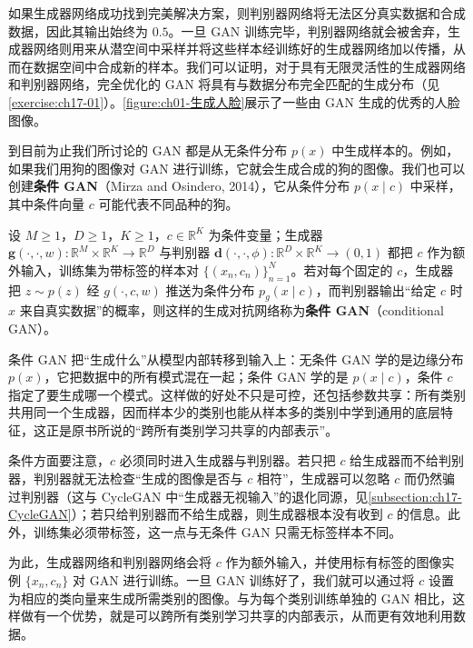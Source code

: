 \documentclass[../../main.tex]{subfiles}
\begin{document}
如果生成器网络成功找到完美解决方案，则判别器网络将无法区分真实数据和合成数据，因此其输出始终为 $0.5$。一旦 GAN 训练完毕，判别器网络就会被舍弃，生成器网络则用来从潜空间中采样并将这些样本经训练好的生成器网络加以传播，从而在数据空间中合成新的样本。我们可以证明，对于具有无限灵活性的生成器网络和判别器网络，完全优化的 GAN 将具有与数据分布完全匹配的生成分布（见\cref{exercise:ch17-01}）。\cref{figure:ch01-生成人脸}展示了一些由 GAN 生成的优秀的人脸图像。

到目前为止我们所讨论的 GAN 都是从无条件分布 $p(x)$ 中生成样本的。例如，如果我们用狗的图像对 GAN 进行训练，它就会生成合成的狗的图像。我们也可以创建\textbf{条件 GAN}（Mirza and Osindero, 2014），它从条件分布 $p(x\mid c)$ 中采样，其中条件向量 $c$ 可能代表不同品种的狗。

\begin{definition}[条件 GAN]\label{definition:ch17-条件GAN}
设 $M\geqslant1$，$D\geqslant1$，$K\geqslant1$，$c\in\mathbb{R}^{K}$ 为条件变量；生成器 $\bm{g}(\cdot,\cdot,w):\mathbb{R}^{M}\times\mathbb{R}^{K}\to\mathbb{R}^{D}$ 与判别器 $\bm{d}(\cdot,\cdot,\phi):\mathbb{R}^{D}\times\mathbb{R}^{K}\to(0,1)$ 都把 $c$ 作为额外输入，训练集为带标签的样本对 $\{(x_n,c_n)\}_{n=1}^{N}$。若对每个固定的 $c$，生成器把 $z\sim p(z)$ 经 $g(\cdot,c,w)$ 推送为条件分布 $p_g(x\mid c)$，而判别器输出“给定 $c$ 时 $x$ 来自真实数据”的概率，则这样的生成对抗网络称为\textbf{条件 GAN}（conditional GAN）。
\end{definition}

\begin{remark}
条件 GAN 把“生成什么”从模型内部转移到输入上：无条件 GAN 学的是边缘分布 $p(x)$，它把数据中的所有模式混在一起；条件 GAN 学的是 $p(x\mid c)$，条件 $c$ 指定了要生成哪一个模式。这样做的好处不只是可控，还包括参数共享：所有类别共用同一个生成器，因而样本少的类别也能从样本多的类别中学到通用的底层特征，这正是原书所说的“跨所有类别学习共享的内部表示”。

条件方面要注意，$c$ 必须同时进入生成器与判别器。若只把 $c$ 给生成器而不给判别器，判别器就无法检查“生成的图像是否与 $c$ 相符”，生成器可以忽略 $c$ 而仍然骗过判别器（这与 CycleGAN 中“生成器无视输入”的退化同源，见\cref{subsection:ch17-CycleGAN}）；若只给判别器而不给生成器，则生成器根本没有收到 $c$ 的信息。此外，训练集必须带标签，这一点与无条件 GAN 只需无标签样本不同。
\end{remark}

为此，生成器网络和判别器网络会将 $c$ 作为额外输入，并使用标有标签的图像实例 $\{x_n,c_n\}$ 对 GAN 进行训练。一旦 GAN 训练好了，我们就可以通过将 $c$ 设置为相应的类向量来生成所需类别的图像。与为每个类别训练单独的 GAN 相比，这样做有一个优势，就是可以跨所有类别学习共享的内部表示，从而更有效地利用数据。
\end{document}
